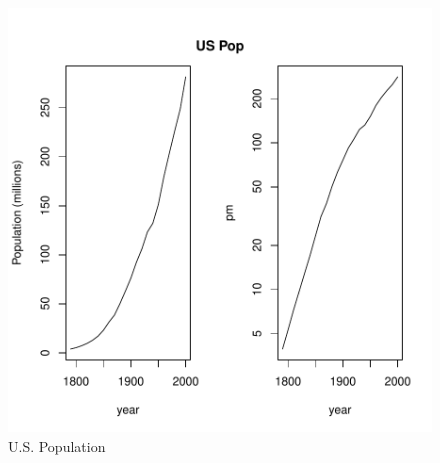 \documentclass[a4paper]{article}
\begin{document}
\begin{figure}
\begin{center}
\includegraphics{GRDT-fig1}
\end{center}
\caption{U.S. Population}
\label{fig:one}
\end{figure}
\end{document}
